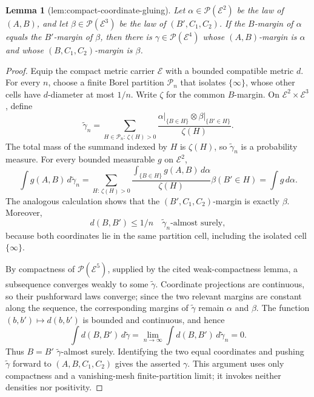 \documentclass{article}
\newtheorem{lemma}{Lemma}
\begin{document}
\begin{lemma}[lem:compact-coordinate-gluing]\label{lem:compact-coordinate-gluing}
Let \(\alpha\in\mathcal P(\mathcal E^2)\) be the law of \((A,B)\), and let \(\beta\in\mathcal P(\mathcal E^3)\) be the law of \((B',C_1,C_2)\).  If the \(B\)-margin of \(\alpha\) equals the \(B'\)-margin of \(\beta\), then there is \(\gamma\in\mathcal P(\mathcal E^4)\) whose \((A,B)\)-margin is \(\alpha\) and whose \((B,C_1,C_2)\)-margin is \(\beta\).
\end{lemma}
\begin{proof}
Equip the compact metric carrier \(\mathcal E\) with a bounded compatible metric \(d\).  For every \(n\), choose a finite Borel partition \(\mathcal P_n\) that isolates \(\{\infty\}\), whose other cells have \(d\)-diameter at most \(1/n\).  Write \(\zeta\) for the common \(B\)-margin.  On \(\mathcal E^2\times\mathcal E^3\), define
\[
 \widetilde\gamma_n
 =\sum_{H\in\mathcal P_n:\,\zeta(H)>0}
 \frac{\alpha\vert_{\{B\in H\}}\otimes
       \beta\vert_{\{B'\in H\}}}{\zeta(H)}.
\]
The total mass of the summand indexed by \(H\) is \(\zeta(H)\), so \(\widetilde\gamma_n\) is a probability measure.  For every bounded measurable \(g\) on \(\mathcal E^2\),
\[
 \int g(A,B)\,d\widetilde\gamma_n
 =\sum_{H:\,\zeta(H)>0}
   \frac{\int_{\{B\in H\}}g(A,B)\,d\alpha}{\zeta(H)}
   \beta(B'\in H)
 =\int g\,d\alpha.
\]
The analogous calculation shows that the \((B',C_1,C_2)\)-margin is exactly \(\beta\).  Moreover,
\[
 d(B,B')\leq 1/n
 \quad\widetilde\gamma_n\text{-almost surely},
\]
because both coordinates lie in the same partition cell, including the isolated cell \(\{\infty\}\).

By compactness of \(\mathcal P(\mathcal E^5)\), supplied by the cited weak-compactness lemma, a subsequence converges weakly to some \(\widetilde\gamma\).  Coordinate projections are continuous, so their pushforward laws converge; since the two relevant margins are constant along the sequence, the corresponding margins of \(\widetilde\gamma\) remain \(\alpha\) and \(\beta\).  The function \((b,b')\mapsto d(b,b')\) is bounded and continuous, and hence
\[
 \int d(B,B')\,d\widetilde\gamma
 =\lim_{n\to\infty}\int d(B,B')\,d\widetilde\gamma_n=0.
\]
Thus \(B=B'\) \(\widetilde\gamma\)-almost surely.  Identifying the two equal coordinates and pushing \(\widetilde\gamma\) forward to \((A,B,C_1,C_2)\) gives the asserted \(\gamma\).  This argument uses only compactness and a vanishing-mesh finite-partition limit; it invokes neither densities nor positivity.
\end{proof}
\end{document}

